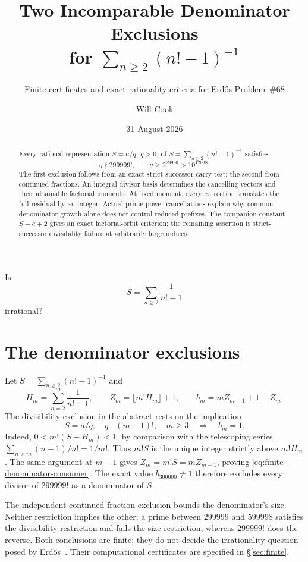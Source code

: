 \documentclass[11pt]{article}
\title{Two Incomparable Denominator Exclusions\\for $\sum_{n\ge2}(n!-1)^{-1}$}
\subtitle{Finite certificates and exact rationality criteria for Erd\H{o}s Problem~\#68}
\author{Will Cook}
\date{31 August 2026}
\newcommand{\Ser}{S}
\begin{document}
\maketitle
\noteprovenance

\begin{problem}[Erd\H{o}s \#68]\label{res:problem}
Is
\[
  \Ser=\sum_{n\ge2}\frac1{n!-1}
\]
irrational?
\end{problem}

\begin{abstract}
Every rational representation $S=a/q$, $q>0$, of
$S=\sum_{n\ge2}(n!-1)^{-1}$ satisfies
\[
q\nmid299999!,\qquad q\ge2^{39990}>10^{12038}.
\]
The first exclusion follows from an exact strict-successor carry test;
the second from continued fractions.  An integral divisor basis determines
the cancelling vectors and their attainable factorial moments.  At fixed
moment, every correction translates the full residual by an integer.
Actual prime-power cancellations explain why common-denominator growth
alone does not control reduced prefixes.  The companion constant $S-e+2$
gives an exact factorial-orbit criterion; the remaining assertion is
strict-successor divisibility failure at arbitrarily large indices.
\end{abstract}

\section{The denominator exclusions}\label{sec:problem}

Let $S=\sum_{n\ge2}(n!-1)^{-1}$ and
\[
H_m=\sum_{n=2}^m\frac1{n!-1},\qquad
Z_m=\lfloor m!H_m\rfloor+1,\qquad
b_m=mZ_{m-1}+1-Z_m.
\]
The divisibility exclusion in the abstract rests on the implication
\begin{equation}
S=a/q,\quad q\mid(m-1)!,\quad m\ge3
\quad\Longrightarrow\quad b_m=1.\label{eq:finite-denominator-consumer}
\end{equation}
Indeed, $0<m!(S-H_m)<1$, by comparison with the telescoping
series $\sum_{n>m}(n-1)/n!=1/m!$.  Thus $m!S$ is the unique integer
strictly above $m!H_m$.  The same argument at $m-1$ gives
$Z_m=m!S=mZ_{m-1}$, proving \eqref{eq:finite-denominator-consumer}.
The exact value $b_{300000}\ne1$ therefore excludes every divisor of
$299999!$ as a denominator of $S$.

The independent continued-fraction exclusion bounds the denominator's size.
Neither restriction implies the other: a prime between $299999$ and $599998$
satisfies the divisibility restriction and fails the size restriction,
whereas $299999!$ does the reverse.  Both conclusions are finite; they do
not decide the irrationality question posed by Erd\H{o}s~\cite{erdos1988,bloom}.
Their computational certificates are specified in \S\ref{sec:finite}.
\end{document}
